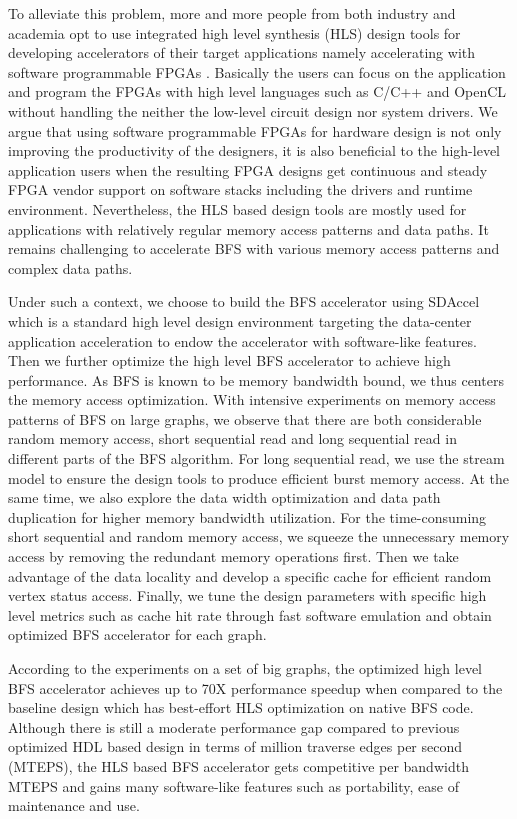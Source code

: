 To alleviate this problem, more and more people from both industry and 
academia opt to use integrated high level synthesis (HLS) design tools for 
developing accelerators of their target applications namely 
accelerating with software programmable FPGAs \cite{koch2016fpgas, xilinx-sdaccel}.
Basically the users can focus on the application and program the FPGAs with high 
level languages such as C/C++ and OpenCL without handling the neither the low-level 
circuit design nor system drivers. We argue that using software programmable FPGAs for hardware 
design is not only improving 
the productivity of the designers, it is also 
beneficial to the high-level application users when the resulting 
FPGA designs get continuous and steady FPGA vendor support on software stacks 
including the drivers and runtime environment. Nevertheless, the HLS based design tools are 
mostly used for applications with relatively regular memory access 
patterns and data paths. It remains challenging to accelerate BFS with various memory 
access patterns and complex data paths.

Under such a context, we choose to build the BFS accelerator using SDAccel 
which is a standard high level design environment targeting 
the data-center application acceleration to endow the accelerator with software-like features.
Then we further optimize the high level BFS accelerator to achieve high performance.
As BFS is known to be memory bandwidth bound, we thus centers the memory 
access optimization. With intensive 
experiments on memory access patterns of BFS on large graphs, we observe 
that there are both considerable random memory access, short sequential read 
and long sequential read in different parts of the BFS algorithm. 
For long sequential read, we use the stream model to ensure the design 
tools to produce efficient burst memory access. At the same time, we also
explore the data width optimization and data path duplication 
for higher memory bandwidth utilization. For the time-consuming 
short sequential and random memory access, we squeeze the 
unnecessary memory access by removing the redundant memory operations first. 
Then we take advantage of the data locality and develop a specific cache for 
efficient random vertex status access. Finally, we tune the design parameters 
with specific high level metrics such as cache hit rate through 
fast software emulation and obtain optimized BFS accelerator for each graph.

According to the experiments on a set of big graphs, the optimized high level BFS 
accelerator achieves up to 70X performance speedup when compared to the baseline 
design which has best-effort HLS optimization on native BFS code. 
Although there is still a moderate performance gap compared to previous 
optimized HDL based design in terms of million traverse edges per second (MTEPS), 
the HLS based BFS accelerator gets competitive per bandwidth 
MTEPS and gains many software-like features 
such as portability, ease of maintenance and use.

